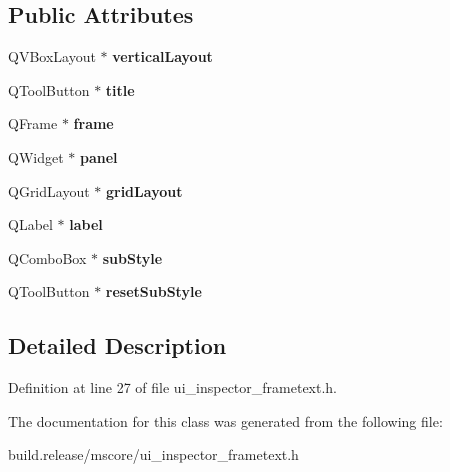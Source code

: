 \subsection*{Public Attributes}
\begin{DoxyCompactItemize}
\item 
\mbox{\label{class_ui___inspector_frame_text_a7d4b50a5dc7d35323a8d5ff631f494d7}} 
Q\+V\+Box\+Layout $\ast$ {\bfseries vertical\+Layout}
\item 
\mbox{\label{class_ui___inspector_frame_text_a655ee48add6c7500982a69404ae54d16}} 
Q\+Tool\+Button $\ast$ {\bfseries title}
\item 
\mbox{\label{class_ui___inspector_frame_text_ab824269231c569bf74d67bab5ed5f8c5}} 
Q\+Frame $\ast$ {\bfseries frame}
\item 
\mbox{\label{class_ui___inspector_frame_text_ac08839477c002c7a0f7f68923eb6fcd1}} 
Q\+Widget $\ast$ {\bfseries panel}
\item 
\mbox{\label{class_ui___inspector_frame_text_afcfe135434396c8d1ba3c53c6c74f23c}} 
Q\+Grid\+Layout $\ast$ {\bfseries grid\+Layout}
\item 
\mbox{\label{class_ui___inspector_frame_text_af569ded1ee32f3c4927ebbbb1cd02dd2}} 
Q\+Label $\ast$ {\bfseries label}
\item 
\mbox{\label{class_ui___inspector_frame_text_ab1d1e0796139133d8547c26c6f445766}} 
Q\+Combo\+Box $\ast$ {\bfseries sub\+Style}
\item 
\mbox{\label{class_ui___inspector_frame_text_a74f59aa88fc7a04676d5b0b1364f9342}} 
Q\+Tool\+Button $\ast$ {\bfseries reset\+Sub\+Style}
\end{DoxyCompactItemize}


\subsection{Detailed Description}


Definition at line 27 of file ui\+\_\+inspector\+\_\+frametext.\+h.



The documentation for this class was generated from the following file\+:\begin{DoxyCompactItemize}
\item 
build.\+release/mscore/ui\+\_\+inspector\+\_\+frametext.\+h\end{DoxyCompactItemize}
